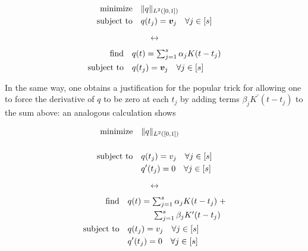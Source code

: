 \documentclass[11pt]{article}
\newcommand{\hs}{\hspace{1mm}}
\newcommand{\HS}{\hspace{3.5mm}}
\newcommand{\bv}{\bm v}
\begin{document}
\noindent
\begin{minipage}{.48\linewidth}
\begin{align}
  \text{minimize} &\HS \|q\|_{L^2([0, 1])} \\
  \text{subject to} &\HS q(t_j) = \bv_j \HS \forall j \in [s]
\end{align}
\end{minipage}
\begin{minipage}{.04\linewidth}
    \[ \leftrightarrow \]
\end{minipage}
\begin{minipage}{.48\linewidth}
\begin{align}
  \text{find} &\HS q(t) = \textstyle\sum_{j = 1}^s \alpha_jK(t - t_j) \\
  \text{subject to} &\HS q(t_j) = \bv_j \HS \forall j \in [s]
\end{align}
\end{minipage}
\vspace{1em}

In the same way, one obtains a justification for the popular trick for allowing one to force the derivative of $q$ to be zero at each $t_j$ by adding terms $\beta_jK^\prime(t - t_j)$ to the sum above: an analogous calculation shows

\noindent
\begin{minipage}{.48\linewidth}
\begin{align}
  \text{minimize} &\HS \|q\|_{L^2([0, 1])} \\ \\
  \text{subject to} &\HS q(t_j) = v_j \HS \forall j \in [s] \\
                  &\HS q^\prime(t_j) = 0 \HS \forall j \in [s]
\end{align}
\end{minipage}
\begin{minipage}{.04\linewidth}
    \[ \leftrightarrow \]
\end{minipage}
\begin{minipage}{.48\linewidth}
\begin{align}
  \text{find} &\HS q(t) = \textstyle\sum_{j = 1}^s \alpha_jK(t - t_j) \hs + \\
  &\HS\HS\HS\HS \textstyle\sum_{j = 1}^s\beta_jK^\prime(t - t_j) \\
  \text{subject to} &\HS q(t_j) = v_j \HS \forall j \in [s] \\
                  &\HS q^\prime(t_j) = 0 \HS \forall j \in [s]
\end{align}
\end{minipage}
\vspace{1em}
\end{document}
